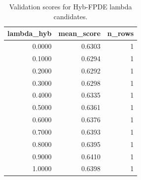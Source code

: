 \begin{table}[t]
\caption{Validation scores for Hyb-FPDE lambda candidates.}
\label{tab:lambda_distribution_computed}
\centering
\begin{tabular}{rrr}
\toprule
lambda\_hyb & mean\_score & n\_rows \\
\midrule
0.0000 & 0.6303 & 1 \\
0.1000 & 0.6294 & 1 \\
0.2000 & 0.6292 & 1 \\
0.3000 & 0.6298 & 1 \\
0.4000 & 0.6335 & 1 \\
0.5000 & 0.6361 & 1 \\
0.6000 & 0.6376 & 1 \\
0.7000 & 0.6393 & 1 \\
0.8000 & 0.6395 & 1 \\
0.9000 & 0.6410 & 1 \\
1.0000 & 0.6398 & 1 \\
\bottomrule
\end{tabular}

\end{table}
